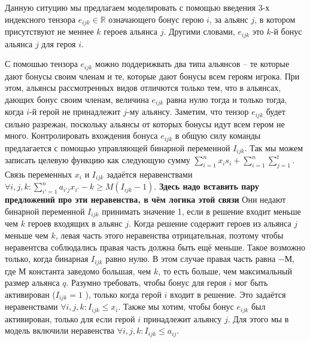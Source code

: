 \documentclass{article}
\begin{document}

Данную ситуцию мы предлагаем моделировать с помощью введения 3-х индексного тензора $e_{ijk} \in \mathbb{R}$ означающего бонус герою $i$, за альянс $j$, в котором присутствуют не меннее $k$ героев альянса $j$. Другими словами, $e_{ijk}$ это $k$-й бонус альянса $j$ для героя $i$.

С помошью тензора $e_{ijk}$ можно поддерижвать два типа альянсов – те которые дают бонусы своим членам и те, которые дают бонусы всем героям игрока. При этом, альянсы рассмотренных видов отличются только тем, что в альянсах, дающих бонус своим членам, величина $e_{ijk}$ равна нулю тогда и только тогда, когда $i$-й герой не принадлежит $j$-му альянсу. Заметим, что тензор  $e_{ijk}$  будет сильно разрежан, поскольку альянсы от которых бонусы идут всем гером не много.  
Контролировать вхождения бонуса $e_{ijk}$ в общую силу команды предлагается с помощью управляющей бинарной переменной $I_{ijk}$.
Так мы можем записать целевую функцию как следующую сумму $\sum_{i=1}^{n} x_i s_i + \sum_{i=1}^{n} \sum_{j=1}^{t} $.
Связь переменных $x_{i}$ и $I_{ijk}$ задаётся неравенствами
$\forall{i,j,k} :  \sum_{i'=1}^{n} a_{i'j} x_{i'} - k \ge M( I_{ijk}  - 1)$. \textbf{Здесь надо вставить пару предложений про эти неравенства, в чём логика этой связи}
Они недают бинарной переменной $I_{ijk}$ принимать значение 1, если в решение входит меньше чем $k$ героев входящих в альянс $j$. Когда решение содержит героев из альянса $j$ меньше чем $k$, левая часть этого неравенства отрицательная, поэтому чтобы неравентсва соблюдались правая часть должна быть ещё меньше. Такое возможно только, когда бинарная $I_{ijk}$ равно нулю. В этом случае правая часть равна $-М$, где $М$ константа заведомо большая, чем $k$, то есть больше, чем максимальный размер альянса $q$.
Разумно требовать, чтобы бонус для героя $i$ мог быть активирован ($I_{ijk} = 1$ ), только когда герой $i$ входит в решение. Это задаётся неравенствами $\forall{i,j,k} :  I_{ijk}  \le x_i$. Также мы хотим, чтобы бонус $e_{ijk}$ был активирован, только для если герой $i$ принадлежит альянсу $j$. Для этого мы в модель включили неравенства $\forall{i,j,k} :  I_{ijk}  \le a_{ij}$.   
\end{document}
